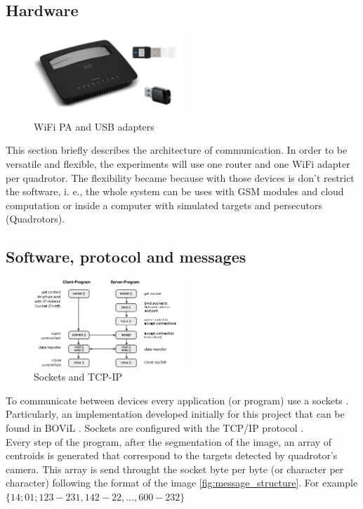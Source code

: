 \subsection{Hardware}
\begin{figure}
	\includegraphics[width=0.5\textwidth]{../Images/c1/hardware_comm.jpg}
	\caption{WiFi PA and USB adapters}
	\label{fig:hardwareComm}
\end{figure}

This section briefly describes the architecture of communication. In order to be versatile and flexible, the experiments will use one router and one WiFi adapter per quadrotor. The flexibility became because with those devices is don't restrict the software, i. e., the whole system can be uses with GSM modules and cloud computation or inside a computer with simulated targets and persecutors (Quadrotors).



\subsection{Software, protocol and messages}

\begin{figure}
	\begin{center}
		\includegraphics[width=0.5\textwidth, natwidth=448, natheight=263]{../Images/c1/socketstcpip.png}
	\end{center}
	\caption{Sockets and TCP-IP}
	\label{fig:socketstcpip}
\end{figure}

To communicate between devices every application (or program) use a sockets \cite{SocketWiki}. Particularly, an implementation developed initially for this project that can be found in BOViL \cite{BOViL}. Sockets are configured with the TCP/IP protocol \cite{TCPIP}. \\
Every step of the program, after the segmentation of the image, an array of centroids is generated that correspond to the targets detected by quadrotor's camera. This array is send throught the socket byte per byte (or character per character) following the format of the image \ref{fig:message_structure}. For example $\{14;01;123-231,142-22,...,600-232\}$

